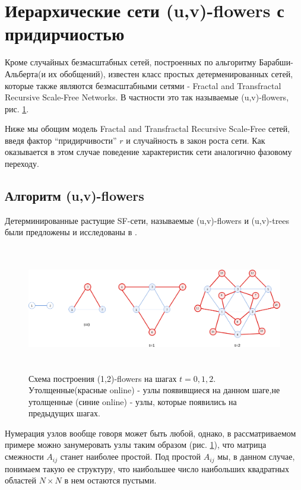 \documentclass[10pt,aps,pra]{revtex4-1}
\begin{document}
\section{Иерархические сети (u,v)-flowers с придирчиостью}
Кроме случайных безмасштабных сетей, построенных по альгоритму Барабши-Альберта(и их обобщений), известен класс простых детерменированных сетей, которые также являются безмасштабными сетями \cite{Rozenfeld2} - Fractal and Transfractal Recursive Scale-Free Networks. В частности это так называемые (u,v)-flowers, рис. \ref{fig:flowerGraph}.

Ниже мы обощим модель Fractal and Transfractal Recursive Scale-Free сетей, введя фактор ``придирчивости'' $r$ и случайность в закон роста сети. Как оказывается в этом случае поведение характеристик сети аналогично фазовому переходу.

\subsection{Алгоритм (u,v)-flowers}
Детерминированные растущие SF-сети, называемые (u,v)-flowers и (u,v)-trees были предложены и исследованы в \cite{Dor1,Rozenfeld1,Rozenfeld2}.

\begin{figure}[H]

\centering
\includegraphics[height=5.5cm]{graphics/hierarhical.png}
\caption{
\label{fig:flowerGraph}
Схема построения (1,2)-flowers на шагах $t=0,1,2$. Утолщенные(красные online) - узлы появивщиеся на данном шаге,не утолщенные (синие online) - узлы, которые появились на предыдущих шагах.}
\end{figure}

Нумерация узлов вообще говоря может быть любой, однако, в рассматриваемом примере можно занумеровать узлы таким образом (рис. \ref{fig:flowerGraph}), что матрица смежности $A_{ij}$ станет наиболее простой. Под простой $A_{ij}$ мы, в данном случае, понимаем такую ее структуру, что наибольшее число наибольших квадратных областей $N \times N$ в нем остаются пустыми.
\end{document}

